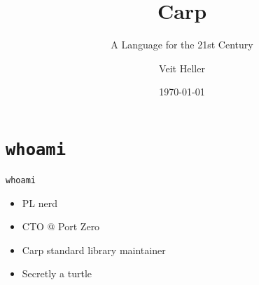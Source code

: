 \documentclass{beamer}
\title{Carp}
\subtitle{A Language for the 21st Century}
\date{\today}
\author{Veit Heller}
\institute{Port Zero}
\begin{document}
  \maketitle
  \section{\texttt{whoami}}
  \begin{frame}{\texttt{whoami}}
    \begin{itemize}
      \item PL nerd
      \item CTO @ Port Zero
      \item Carp standard library maintainer
      \item Secretly a turtle
    \end{itemize}
  \end{frame}
\end{document}
